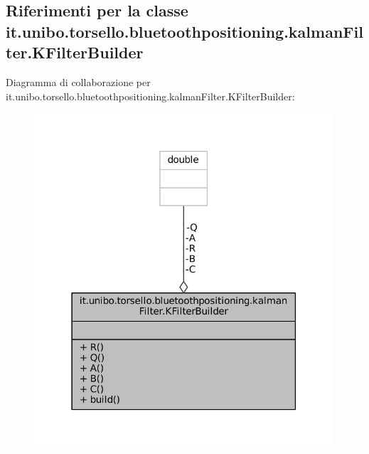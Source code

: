 \hypertarget{classit_1_1unibo_1_1torsello_1_1bluetoothpositioning_1_1kalmanFilter_1_1KFilterBuilder}{}\subsection{Riferimenti per la classe it.\+unibo.\+torsello.\+bluetoothpositioning.\+kalman\+Filter.\+K\+Filter\+Builder}
\label{classit_1_1unibo_1_1torsello_1_1bluetoothpositioning_1_1kalmanFilter_1_1KFilterBuilder}


Diagramma di collaborazione per it.\+unibo.\+torsello.\+bluetoothpositioning.\+kalman\+Filter.\+K\+Filter\+Builder\+:
\nopagebreak
\begin{figure}[H]
\begin{center}
\leavevmode
\includegraphics[width=316pt]{classit_1_1unibo_1_1torsello_1_1bluetoothpositioning_1_1kalmanFilter_1_1KFilterBuilder__coll__graph}
\end{center}
\end{figure}
